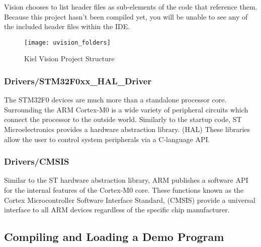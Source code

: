 \documentclass[openany,11pt,fleqn]{book} %
\begin{document}
\begin{warning}
	{\textmu}Vision chooses to list header files as sub-elements of the code that reference them. Because this project hasn't been compiled yet, you will be unable to see any of the included header files within the IDE.
\end{warning}

\begin{figure}[h!]
	\centering\texttt{[image: uvision\_folders]}
	\caption{Kiel {\textmu}Vision Project Structure}
	\label{uvision_folders}
\end{figure}

\subsubsection*{Drivers/STM32F0xx\_HAL\_Driver}
The STM32F0 devices are much more than a standalone processor core. Surrounding the ARM Cortex-M0 is a wide variety of peripheral circuits which connect the processor to the outside world. Similarly to the startup code, ST Microelectronics provides a hardware abstraction library. (HAL) These libraries allow the user to control system peripherals via a C-language API. %

\subsubsection*{Drivers/CMSIS}
Similar to the ST hardware abstraction library, ARM publishes a software API for the internal features of the Cortex-M0 core. These functions known as the Cortex Microcontroller Software Interface Standard, (CMSIS) provide a universal interface to all ARM devices regardless of the specific chip manufacturer. 

\subsection{\color{orange}Compiling and Loading a Demo Program }
\end{document}
